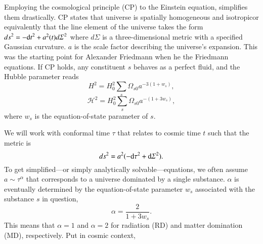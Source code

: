 



\newcommand*\pert{\ALIASpert}







Employing the cosmological principle (CP) to the Einstein equation, simplifies them drastically. CP states that universe is spatially homogeneous and isotropicor equivalently that the line element of the universe takes the form 
${ds}^2 = -{\diff t}^2 + a^2(t){d\varSigma}^2$ where ${d\varSigma}$
is a three-dimensional metric with a specified Gaussian curvature. $a$ is the scale factor describing the universe's expansion. %
This was the starting point for Alexander Friedmann when he  the Friedmann equations. If CP holds, any constituent $s$ behaves as a perfect fluid, and the Hubble parameter reads 
\begin{equation}\label{eq:GR:lcdm:first_Friedmann}
    H^2 = H_0^2 \sum_s \Omega_{s0} a^{-3(1+w_s)},
\end{equation}
\begin{equation}\label{eq:GR:lcdm:first_Friedmann_conformal}
    \mathcal{H}^2 = H_0^2 \sum_s \Omega_{s0} a^{-(1+3w_s)},
\end{equation}
where $w_s$ is the equation-of-state parameter of $s$. 







We will work with conformal time $\tau$ that relates to cosmic time $t$ such that the metric is%
\begin{equation}
    {ds}^2 = a^2 (-{\diff \tau}^2+ {\diff \varSigma}^2).
\end{equation}
To get simplified---or simply analytically solvable---equations, we often assume $a\sim \tau^\alpha$ that corresponds to a universe dominated by a single substance. $\alpha$ is eventually determined by the equation-of-state parameter $w_s$ associated with the substance $s$ in question,
\begin{equation}
    \alpha = \frac{2}{1+3w_s}.
\end{equation}
This means that $\alpha=1$ and $\alpha=2$ for radiation (RD) and matter domination (MD), respectively. Put in cosmic context, 


